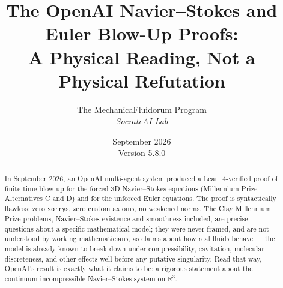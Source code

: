 \documentclass[11pt,a4paper]{article}
\title{\textbf{The OpenAI Navier--Stokes and Euler Blow-Up Proofs:\\ A Physical Reading, Not a Physical Refutation}}
\author{The MechanicaFluidorum Program \\ \textit{SocrateAI Lab}}
\date{September 2026 \\ \small Version 5.8.0}
\begin{document}
\maketitle

\begin{abstract}
In September 2026, an OpenAI multi-agent system produced a Lean~4-verified proof of finite-time
blow-up for the forced 3D Navier--Stokes equations (Millennium Prize Alternatives C and D) and for
the unforced Euler equations. The proof is syntactically flawless: zero \texttt{sorry}s, zero custom
axioms, no weakened norms. The Clay Millennium Prize problems, Navier--Stokes existence and
smoothness included, are precise questions about a specific mathematical model; they were never
framed, and are not understood by working mathematicians, as claims about how real fluids behave
--- the model is already known to break down under compressibility, cavitation, molecular
discreteness, and other effects well before any putative singularity. Read that way, OpenAI's
result is exactly what it claims to be: a rigorous statement about the continuum incompressible
Navier--Stokes system on $\mathbb{R}^3$.


\end{abstract}
\end{document}
